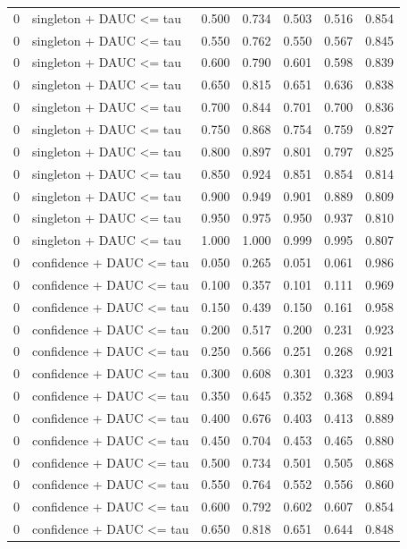 \begin{tabular}{rlrrrrr}
0 & singleton + DAUC <= tau & 0.500 & 0.734 & 0.503 & 0.516 & 0.854 \\
0 & singleton + DAUC <= tau & 0.550 & 0.762 & 0.550 & 0.567 & 0.845 \\
0 & singleton + DAUC <= tau & 0.600 & 0.790 & 0.601 & 0.598 & 0.839 \\
0 & singleton + DAUC <= tau & 0.650 & 0.815 & 0.651 & 0.636 & 0.838 \\
0 & singleton + DAUC <= tau & 0.700 & 0.844 & 0.701 & 0.700 & 0.836 \\
0 & singleton + DAUC <= tau & 0.750 & 0.868 & 0.754 & 0.759 & 0.827 \\
0 & singleton + DAUC <= tau & 0.800 & 0.897 & 0.801 & 0.797 & 0.825 \\
0 & singleton + DAUC <= tau & 0.850 & 0.924 & 0.851 & 0.854 & 0.814 \\
0 & singleton + DAUC <= tau & 0.900 & 0.949 & 0.901 & 0.889 & 0.809 \\
0 & singleton + DAUC <= tau & 0.950 & 0.975 & 0.950 & 0.937 & 0.810 \\
0 & singleton + DAUC <= tau & 1.000 & 1.000 & 0.999 & 0.995 & 0.807 \\
0 & confidence + DAUC <= tau & 0.050 & 0.265 & 0.051 & 0.061 & 0.986 \\
0 & confidence + DAUC <= tau & 0.100 & 0.357 & 0.101 & 0.111 & 0.969 \\
0 & confidence + DAUC <= tau & 0.150 & 0.439 & 0.150 & 0.161 & 0.958 \\
0 & confidence + DAUC <= tau & 0.200 & 0.517 & 0.200 & 0.231 & 0.923 \\
0 & confidence + DAUC <= tau & 0.250 & 0.566 & 0.251 & 0.268 & 0.921 \\
0 & confidence + DAUC <= tau & 0.300 & 0.608 & 0.301 & 0.323 & 0.903 \\
0 & confidence + DAUC <= tau & 0.350 & 0.645 & 0.352 & 0.368 & 0.894 \\
0 & confidence + DAUC <= tau & 0.400 & 0.676 & 0.403 & 0.413 & 0.889 \\
0 & confidence + DAUC <= tau & 0.450 & 0.704 & 0.453 & 0.465 & 0.880 \\
0 & confidence + DAUC <= tau & 0.500 & 0.734 & 0.501 & 0.505 & 0.868 \\
0 & confidence + DAUC <= tau & 0.550 & 0.764 & 0.552 & 0.556 & 0.860 \\
0 & confidence + DAUC <= tau & 0.600 & 0.792 & 0.602 & 0.607 & 0.854 \\
0 & confidence + DAUC <= tau & 0.650 & 0.818 & 0.651 & 0.644 & 0.848 \\

\end{tabular}
